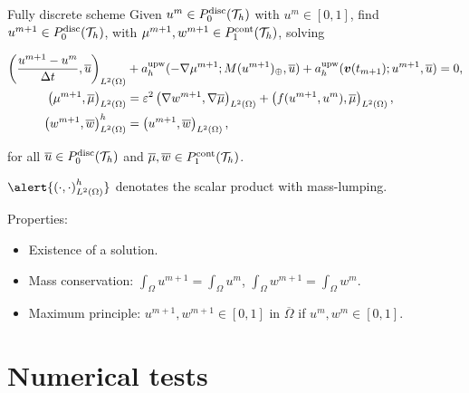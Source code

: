 \begin{frame}{Fully discrete scheme}
	\footnotesize
	Given $u^m\in\relax{P}^{\text{disc}}_0(\mathcal{T}_h)$ with $u^m\in[0,1]$, find $u^{m+1}\in \relax{P}^{\text{disc}}_0(\mathcal{T}_h)$, with $\mu^{m+1},w^{m+1}\in \relax{P}^{\text{cont}}_1(\mathcal{T}_h)$, solving
	\begin{block}{}
	\vspace*{-0.6cm}
	\begin{subequations}
		\label{esquema_DG_upw_Eyre_cahn-hilliard+adveccion}
		\begin{align*}
			\left(\frac{u^{m+1}-u^m}{\Delta t},\overline{u}\right)_{L^2(\Omega)}&+a_h^{\text{upw}}(-\nabla\mu^{m+1};M(u^{m+1})_{\oplus},\overline{u})+a_h^{\text{upw}}(\boldsymbol{v}(t_{m+1});u^{m+1},\overline{u})=0,\\
			\left(\mu^{m+1},\overline{\mu}\right)_{L^2(\Omega)}&=\varepsilon^2 \left(\nabla w^{m+1},\nabla\overline{\mu}\right)_{L^2(\Omega)}+ \left(f(u^{m+1},u^m),\overline{\mu}\right)_{L^2(\Omega)},\\
			\left(w^{m+1},\overline{w}\right)_{L^2(\Omega)}^h&=
			\left(u^{m+1},\overline{w}\right)_{L^2(\Omega)},
		\end{align*}
	\end{subequations}
	\end{block}{}
	for all $\overline{u}\in \relax{P}^{\text{disc}}_0(\mathcal{T}_h)$ and  $\overline{\mu}, \overline{w}\in \relax{P}^{\text{cont}}_1(\mathcal{T}_h)$.
	
	\vspace*{0.3cm}
	$\alert{\escalarL{\cdot}{\cdot}^h}$ denotates the scalar product with mass-lumping.
	
	\vspace*{0.3cm}
	Properties:
	\begin{itemize}
		\item \alert{Existence} of a solution.
		\item \alert{Mass conservation}: $\int_\Omega u^{m+1}=\int_\Omega u^m$, $\int_\Omega w^{m+1}=\int_\Omega w^m$.
		\item \alert{Maximum principle}: $u^{m+1}, w^{m+1}\in[0,1]$ in $ \overline\Omega$ if $u^m,w^m\in[0,1]$.
	\end{itemize}
\end{frame}

\section{Numerical tests}

